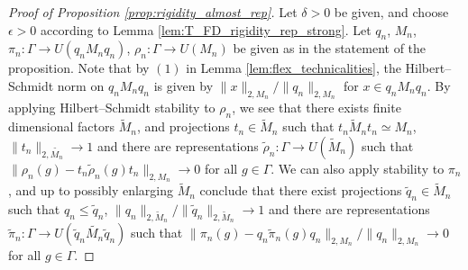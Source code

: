 \documentclass[11pt]{amsart}
\newcommand{\N}{{\mathbb{N}}}
\newcommand{\cH}{{\mathcal{H}}}
\theoremstyle{definition}
\theoremstyle{remark}
\theoremstyle{definition}
\begin{document}
\begin{proof}[Proof of Proposition \ref{prop:rigidity_almost_rep}]
    
    Let $\delta > 0$ be given, and choose $\epsilon > 0$ according to Lemma \ref{lem:T_FD_rigidity_rep_strong}. Let $q_n$, $M_n$, $\pi_n: \Gamma \to U(q_nM_nq_n)$, $\rho_n : \Gamma \to U(M_n)$ be given as in the statement of the proposition.
    Note that by $(1)$ in Lemma \ref{lem:flex_technicalities}, the Hilbert--Schmidt norm on $q_n M_n q_n$ is given by $\| x \|_{2, M_n} / \| q_n \|_{2,M_n}$ for $x \in q_n M_n q_n$.
    By applying Hilbert--Schmidt stability to $\rho_n$, we see that there exists finite dimensional factors $\widetilde{M}_n$, and projections $t_n \in \widetilde{M}_n$ such that $t_n \widetilde{M}_n t_n \simeq M_n$, $\| t_n \|_{2, \widetilde{M_n}} \to 1$ and there are representations $\tilde \rho_n: \Gamma \to U(\widetilde{M}_n)$ such that $\| \rho_n(g) - t_n \tilde \rho_n(g) t_n \|_{2, M_n} \to 0$ for all $g \in \Gamma$.
    We can also apply stability to $\pi_n$, and up to possibly enlarging $\widetilde{M}_n$ conclude that there exist projections $\tilde q_n \in \widetilde{M}_n$ such that $q_n \leq \tilde q_n$, $\|q_n\|_{2,\widetilde{M}_n} / \| \tilde q_n \|_{2,\widetilde{M}_n} \to 1$ and there are representations $\tilde{\pi}_n: \Gamma \to U(\tilde q_n \widetilde{M_n} \tilde q_n)$ such that $\| \pi_n(g) - q_n \tilde \pi_n(g) q_n \|_{2, M_n} / \|q_n \|_{2,M_n} \to 0$ for all $g \in \Gamma$.
    

\end{proof}
\end{document}
